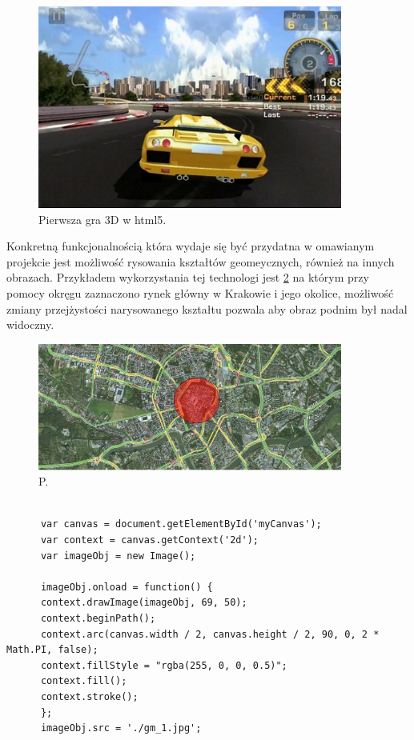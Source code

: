 \begin{figure}[H]
  \centering
    \includegraphics[width=100mm]{ge/html5_3d.jpg}
  \caption{Pierwsza gra 3D w html5.}
  \label{fig:html3d}
\end{figure}

Konkretną funkcjonalnością która wydaje się być przydatna w omawianym projekcie jest możliwość rysowania kształtów geomeycznych, również na innych obrazach. Przykładem wykorzystania tej technologi jest \ref{fig:canvas1} na którym przy pomocy okręgu zaznaczono rynek główny w Krakowie i jego okolice, możliwość zmiany przejżystości narysowanego kształtu pozwala aby obraz podnim był nadal widoczny.

  \begin{figure}[H]
  \centering
    \includegraphics[width=100mm]{ge/canvas1.jpg}
  \caption{P.}
  \label{fig:canvas1}
\end{figure}

\lstset{language=JavaScript}
\begin{lstlisting}[caption=json]

      var canvas = document.getElementById('myCanvas');
      var context = canvas.getContext('2d');
      var imageObj = new Image();
	
      imageObj.onload = function() {
      context.drawImage(imageObj, 69, 50);
	  context.beginPath();
      context.arc(canvas.width / 2, canvas.height / 2, 90, 0, 2 * Math.PI, false);
      context.fillStyle = "rgba(255, 0, 0, 0.5)";
      context.fill();
      context.stroke();
      };
      imageObj.src = './gm_1.jpg';

\end{lstlisting}

